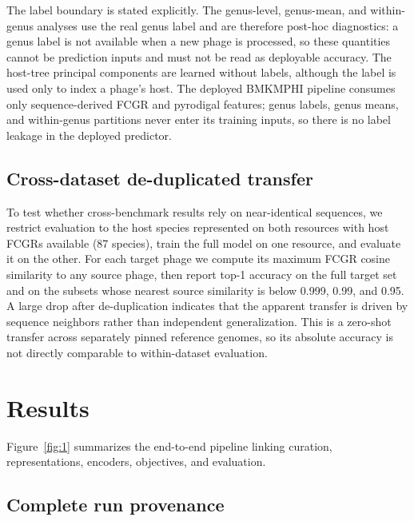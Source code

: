 \documentclass[utf8]{FrontiersinVancouver}
\begin{document}
The label boundary is stated explicitly. The genus-level, genus-mean, and within-genus analyses use the real genus label and are therefore post-hoc diagnostics: a genus label is not available when a new phage is processed, so these quantities cannot be prediction inputs and must not be read as deployable accuracy. The host-tree principal components are learned without labels, although the label is used only to index a phage's host. The deployed BMKMPHI pipeline consumes only sequence-derived FCGR and pyrodigal features; genus labels, genus means, and within-genus partitions never enter its training inputs, so there is no label leakage in the deployed predictor.

\subsection{Cross-dataset de-duplicated transfer}

To test whether cross-benchmark results rely on near-identical sequences, we restrict evaluation to the host species represented on both resources with host FCGRs available (87 species), train the full model on one resource, and evaluate it on the other. For each target phage we compute its maximum FCGR cosine similarity to any source phage, then report top-1 accuracy on the full target set and on the subsets whose nearest source similarity is below 0.999, 0.99, and 0.95. A large drop after de-duplication indicates that the apparent transfer is driven by sequence neighbors rather than independent generalization. This is a zero-shot transfer across separately pinned reference genomes, so its absolute accuracy is not directly comparable to within-dataset evaluation.

\section{Results}

Figure~\ref{fig:1} summarizes the end-to-end pipeline linking curation, representations, encoders, objectives, and evaluation.

\subsection{Complete run provenance}
\end{document}
